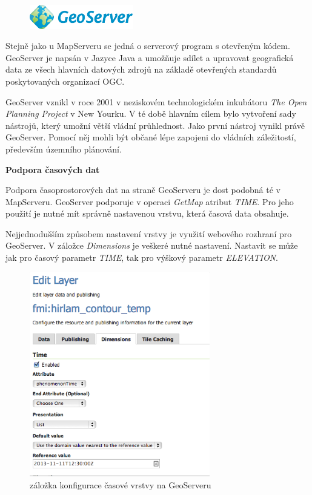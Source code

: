 \begin{figure}[h!]
	\centering
	\includegraphics[width=0.4\textwidth]{../img/geoserver-logo.png}
	\label{fig:geoserver-logo}
\end{figure}
\bigskip

Stejně jako u MapServeru se jedná o serverový program s otevřeným kódem. GeoServer je napsán v Jazyce Java a umožňuje sdílet a upravovat geografická data ze všech hlavních datových zdrojů na základě otevřených standardů poskytovaných organizací OGC. 

GeoServer vznikl v roce 2001 v neziskovém technologickém inkubátoru \textit{The Open Planning Project} v New Yourku. V té době hlavním cílem bylo vytvoření sady nástrojů, který umožní větší vládní průhlednost. Jako první nástroj vynikl právě GeoServer. Pomocí něj mohli být občané lépe zapojeni do vládních záležitostí, především územního plánování.

\bigskip
\noindent
\textbf{Podpora časových dat}

Podpora časoprostorových dat na straně GeoServeru je dost podobná té v MapServeru. GeoServer podporuje v operaci \textit{GetMap} atribut \textit{TIME}. Pro jeho použití je nutné mít správně nastavenou vrstvu, která časová data obsahuje.

Nejjednodušším způsobem nastavení vrstvy je využití webového rozhraní pro GeoServer. V záložce \textit{Dimensions} je veškeré nutné nastavení. Nastavit se může jak pro časový parametr \textit{TIME}, tak pro výškový parametr \textit{ELEVATION}.

\begin{figure}[h!]
	\centering
	\includegraphics[width=0.7\textwidth]{../img/geoserver-layer-edit.png}
	\caption{záložka konfigurace časové vrstvy na GeoServeru \cite{geoserver-layer-edit}}
	\label{fig:geoserver-layer-edit}
\end{figure}

